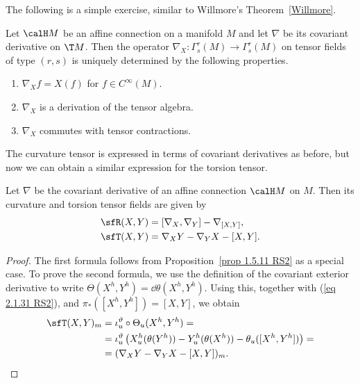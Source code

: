 The following is a simple exercise, similar to Willmore's Theorem~\ref{Willmore}.
\begin{prop}[{{\cite[Prop.~2.1.18]{RS2}}}]\label{prop 2.1.18 RS2}
    Let $\calH M$ be an affine connection on a manifold $M$ and let $\nabla$ be its covariant derivative on $\T M$. Then the operator $\nabla_X:\Gamma^r_s(M)\to \Gamma^r_s(M)$ on tensor fields of type $(r,s)$ is uniquely determined by the following properties.
    \begin{enumerate}
        \item $\nabla_X f=X(f)$ for $f\in C^\infty(M)$.
        \item $\nabla_X$ is a derivation of the tensor algebra.
        \item $\nabla_X$ commutes with tensor contractions.
    \end{enumerate}
\end{prop}

The curvature tensor is expressed in terms of covariant derivatives as before, but now we can obtain a similar expression for the torsion tensor.

\begin{prop}[{{\cite[Prop.~2.1.19]{RS2}}}]\label{prop 2.1.19 RS2}
    Let $\nabla$ be the covariant derivative of an affine connection $\calH M$ on $M$. Then its curvature and torsion tensor fields are given by 
    \begin{align}
        \sfR(X,Y)&=[\nabla_X,\nabla_Y]-\nabla_{[X,Y]},\\
        \sfT(X,Y)&=\nabla_X Y-\nabla_Y X-[X,Y].\label{eq 2.1.33 RS2}
    \end{align}
\end{prop}
\begin{proof}
    The first formula follows from Proposition~\ref{prop 1.5.11 RS2} as a special case. To prove the second formula, we use the definition of the covariant exterior derivative to write $\Theta(X^h,Y^h)=\dd\theta(X^h,Y^h)$. Using this, together with (\ref{eq 2.1.31 RS2}), and $\pi_\ast([X^h,Y^h])=[X,Y]$, we obtain 
    \begin{align}
        \sfT(X,Y)_m&=\iota_u^\vartheta\circ \Theta_u(X^h,Y^h)=\\
        &= \iota_u^\vartheta\left(X^h_u(\theta(Y^h))-Y^h_u(\theta(X^h))-\theta_u([X^h,Y^h])\right)=\\
        &=(\nabla_X Y-\nabla_Y X-[X,Y])_m.
    \end{align}
\end{proof}


